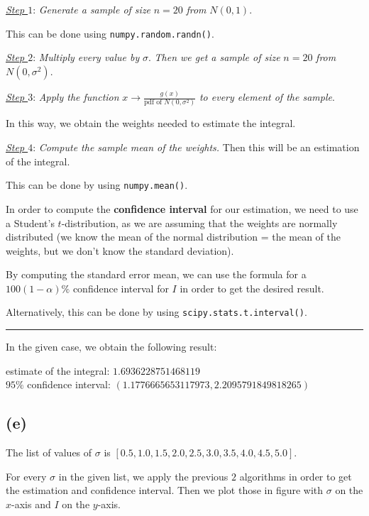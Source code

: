 \documentclass[11pt]{article}
\newcommand{\subsectionindent}{\hspace{30pt}}
\begin{document}
\quad \textit{\underline{Step $1$}}: \textit{Generate a sample of size} $n = 20$ \textit{from} $N(0,1)$.

This can be done using \verb+numpy.random.randn()+.

\quad \textit{\underline{Step $2$}}: \textit{Multiply every value by} $\sigma$. \textit{Then we get a sample of size} $n = 20$ \textit{from} $N(0,\sigma ^ 2)$.

\quad \textit{\underline{Step $3$}}: \textit{Apply the function} $x \to \frac{ g(x) }{ \text{pdf of } N(0,\sigma ^ 2)}$ \textit{to every element of the sample}. 

In this way, we obtain the weights needed to estimate the integral.

\quad \textit{\underline{Step $4$}}: \textit{Compute the sample mean of the weights.} Then this will be an estimation of the integral.

This can be done by using \verb+numpy.mean()+.

\medskip

In order to compute the \textbf{confidence interval} for our estimation, we need to use a Student’s $t$-distribution, as we are assuming that the weights are normally
distributed (we know the mean of the normal distribution = the mean of the weights, but we don't know the standard deviation).

By computing the standard error mean, we can use the formula for a $100(1 - \alpha) \% $ confidence interval for $I$ in order to get the desired result.

Alternatively, this can be done by using \verb+scipy.stats.t.interval()+.


\rule{\textwidth / 2}{0.4pt}

In the given case, we obtain the following result:

    estimate of the integral:  $1.6936228751468119$
\\  $95\%$ confidence interval:  $(1.1776665653117973, 2.2095791849818265)$


\subsection*{\subsectionindent (e)}

The list of values of $\sigma$ is $[0.5, 1.0, 1.5, 2.0, 2.5, 3.0, 3.5, 4.0, 4.5, 5.0]$.

For every $\sigma$ in the given list, we apply the previous $2$ algorithms in order to get the estimation and confidence interval. Then we plot those in figure with $\sigma$ on the $x$-axis and $I$ on the $y$-axis.
\end{document}
